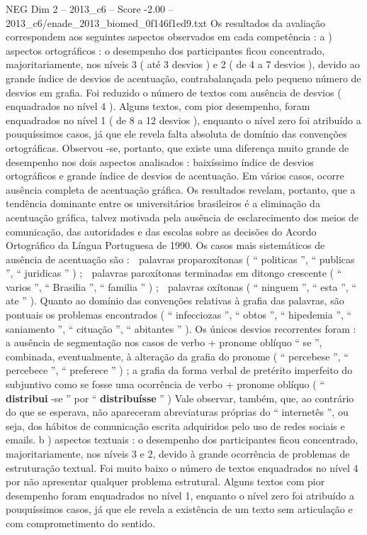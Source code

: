 \begin{textsample}{NEG Dim 2 – 2013\_c6 – Score -2.00 – 2013\_c6/enade\_2013\_biomed\_0f146f1ed9.txt}
Os resultados da avaliação correspondem aos seguintes aspectos observados em cada competência : a ) aspectos ortográficos : o desempenho dos participantes ficou concentrado, majoritariamente, nos níveis 3 ( até 3 desvios ) e 2 ( de 4 a 7 desvios ), devido ao grande índice de desvios de acentuação, contrabalançada pelo pequeno número de desvios em grafia.
Foi reduzido o número de textos com ausência de desvios ( enquadrados no nível 4 ).
Alguns textos, com pior desempenho, foram enquadrados no nível 1 ( de 8 a 12 desvios ), enquanto o nível zero foi atribuído a pouquíssimos casos, já que ele revela falta absoluta de domínio das convenções ortográficas.
Observou -se, portanto, que existe uma diferença muito grande de desempenho nos dois aspectos analisados : baixíssimo índice de desvios ortográficos e grande índice de desvios de acentuação.
Em vários casos, ocorre ausência completa de acentuação gráfica.
Os resultados revelam, portanto, que a tendência dominante entre os universitários brasileiros é a eliminação da acentuação gráfica, talvez motivada pela ausência de esclarecimento dos meios de comunicação, das autoridades e das escolas sobre as decisões do Acordo Ortográfico da Língua Portuguesa de 1990.
Os casos mais sistemáticos de ausência de acentuação são :  palavras proparoxítonas ( “ politicas ”, “ publicas ”, “ juridicas ” ) ;  palavras paroxítonas terminadas em ditongo crescente ( “ varios ”, “ Brasilia ”, “ familia ” ) ;  palavras oxítonas ( “ ninguem ”, “ esta ”, “ ate ” ).
Quanto ao domínio das convenções relativas à grafia das palavras, são pontuais os problemas encontrados ( “ infecciozas ”, “ obtos ”, “ hipedemia ”, “ saniamento ”, “ cituação ”, “ abitantes ” ).
Os únicos desvios recorrentes foram : a ausência de segmentação nos casos de verbo + pronome oblíquo “ se ”, combinada, eventualmente, à alteração da grafia do pronome ( “ percebese ”, “ percebece ”, “ preferece ” ) ; a grafia da forma verbal de pretérito imperfeito do subjuntivo como se fosse uma ocorrência de verbo + pronome oblíquo ( “ \textbf{distribui} -se ” por “ \textbf{distribuísse} ” ) Vale observar, também, que, ao contrário do que se esperava, não apareceram abreviaturas próprias do “ internetês ”, ou seja, dos hábitos de comunicação escrita adquiridos pelo uso de redes sociais e emails. b ) aspectos textuais : o desempenho dos participantes ficou concentrado, majoritariamente, nos níveis 3 e 2, devido à grande ocorrência de problemas de estruturação textual.
Foi muito baixo o número de textos enquadrados no nível 4 por não apresentar qualquer problema estrutural.
Alguns textos com pior desempenho foram enquadrados no nível 1, enquanto o nível zero foi atribuído a pouquíssimos casos, já que ele revela a existência de um texto sem articulação e com comprometimento do sentido.

\end{textsample}
